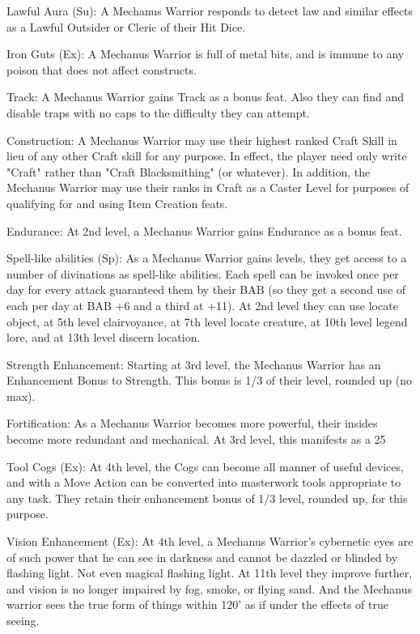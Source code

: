 Lawful Aura (Su): A Mechanus Warrior responds to detect law and similar effects as a Lawful Outsider or Cleric of their Hit Dice.

Iron Guts (Ex): A Mechanus Warrior is full of metal bits, and is immune to any poison that does not affect constructs.

Track: A Mechanus Warrior gains Track as a bonus feat. Also they can find and disable traps with no caps to the difficulty they can attempt.

Construction: A Mechanus Warrior may use their highest ranked Craft Skill in lieu of any other Craft skill for any purpose. In effect, the player need only write "Craft" rather than "Craft Blacksmithing" (or whatever). In addition, the Mechanus Warrior may use their ranks in Craft as a Caster Level for purposes of qualifying for and using Item Creation feats.

Endurance: At 2nd level, a Mechanus Warrior gains Endurance as a bonus feat.

Spell-like abilities (Sp): As a Mechanus Warrior gains levels, they get access to a number of divinations as spell-like abilities. Each spell can be invoked once per day for every attack guaranteed them by their BAB (so they get a second use of each per day at BAB +6 and a third at +11). At 2nd level they can use locate object, at 5th level clairvoyance, at 7th level locate creature, at 10th level legend lore, and at 13th level discern location.

Strength Enhancement: Starting at 3rd level, the Mechanus Warrior has an Enhancement Bonus to Strength. This bonus is 1/3 of their level, rounded up (no max).

Fortification: As a Mechanus Warrior becomes more powerful, their insides become more redundant and mechanical. At 3rd level, this manifests as a 25%

Tool Cogs (Ex): At 4th level, the Cogs can become all manner of useful devices, and with a Move Action can be converted into masterwork tools appropriate to any task. They retain their enhancement bonus of 1/3 level, rounded up, for this purpose.

Vision Enhancement (Ex): At 4th level, a Mechanus Warrior's cybernetic eyes are of such power that he can see in darkness and cannot be dazzled or blinded by flashing light. Not even magical flashing light. At 11th level they improve further, and vision is no longer impaired by fog, smoke, or flying sand. And the Mechanus warrior sees the true form of things within 120' as if under the effects of true seeing.

